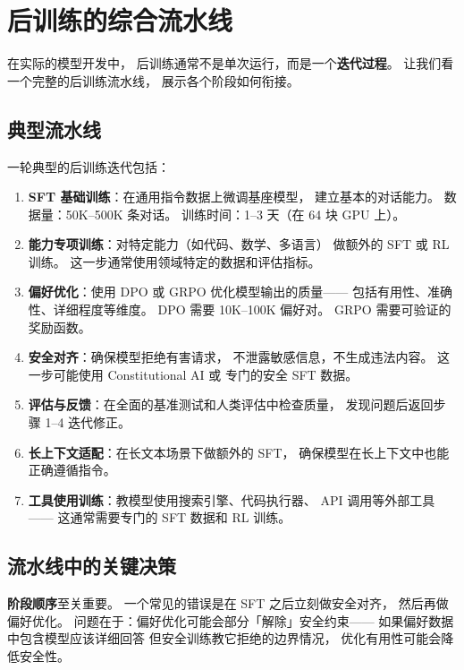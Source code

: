 \section{后训练的综合流水线}

在实际的模型开发中，
后训练通常不是单次运行，而是一个\textbf{迭代过程}。
让我们看一个完整的后训练流水线，
展示各个阶段如何衔接。

\subsection{典型流水线}

一轮典型的后训练迭代包括：

\begin{enumerate}[noitemsep]
  \item \textbf{SFT 基础训练}：在通用指令数据上微调基座模型，
        建立基本的对话能力。
        数据量：50K--500K 条对话。
        训练时间：1--3 天（在 64 块 GPU 上）。
  \item \textbf{能力专项训练}：对特定能力（如代码、数学、多语言）
        做额外的 SFT 或 RL 训练。
        这一步通常使用领域特定的数据和评估指标。
  \item \textbf{偏好优化}：使用 DPO 或 GRPO 优化模型输出的质量——
        包括有用性、准确性、详细程度等维度。
        DPO 需要 10K--100K 偏好对。
        GRPO 需要可验证的奖励函数。
  \item \textbf{安全对齐}：确保模型拒绝有害请求，
        不泄露敏感信息，不生成违法内容。
        这一步可能使用 Constitutional AI 或
        专门的安全 SFT 数据。
  \item \textbf{评估与反馈}：在全面的基准测试和人类评估中检查质量，
        发现问题后返回步骤 1--4 迭代修正。
  \item \textbf{长上下文适配}：在长文本场景下做额外的 SFT，
        确保模型在长上下文中也能正确遵循指令。
  \item \textbf{工具使用训练}：教模型使用搜索引擎、代码执行器、
        API 调用等外部工具——
        这通常需要专门的 SFT 数据和 RL 训练。
\end{enumerate}

\subsection{流水线中的关键决策}

\textbf{阶段顺序}至关重要。
一个常见的错误是在 SFT 之后立刻做安全对齐，
然后再做偏好优化。
问题在于：偏好优化可能会部分「解除」安全约束——
如果偏好数据中包含模型应该详细回答
但安全训练教它拒绝的边界情况，
优化有用性可能会降低安全性。


